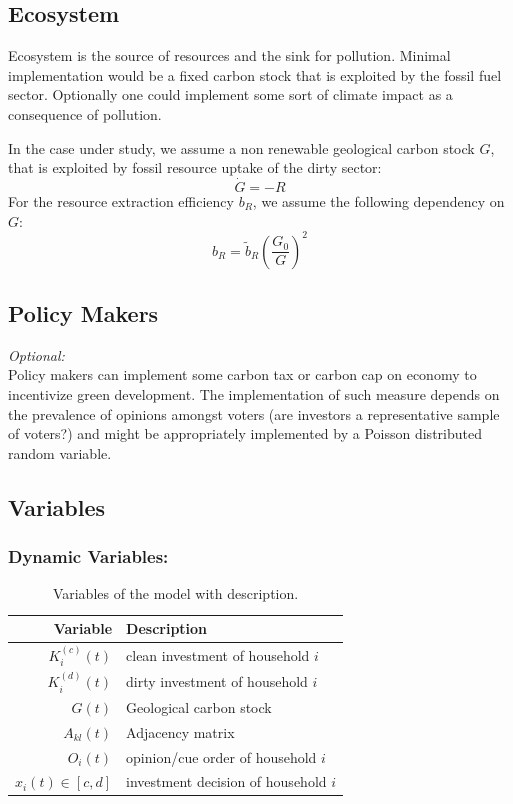 \subsection{Ecosystem}
Ecosystem is the source of resources and the sink for pollution. Minimal implementation would be a fixed carbon stock that is exploited by the fossil fuel sector. Optionally one could implement some sort of climate impact as a consequence of pollution.

In the case under study, we assume a non renewable geological carbon stock $G$, that is exploited by fossil resource uptake of the dirty sector:
\begin{equation}
	\dot{G} = -R
	\label{resource_dynamics}
\end{equation}
For the resource extraction efficiency $b_R$, we assume the following dependency on $G$:
\begin{equation}
	b_R = \tilde{b}_R \left( \frac{G_0}{G} \right)^{2}
	\label{extraction_efficiency}
\end{equation}


\subsection{Policy Makers}
\textit{Optional:} \\
Policy makers can implement some carbon tax or carbon cap on economy to incentivize green development. The implementation of such measure depends on the prevalence of opinions amongst voters (are investors a representative sample of voters?) and might be appropriately implemented by a Poisson distributed random variable.

\subsection{Variables}

\subsubsection{Dynamic Variables:}

\begin{table}[H]
	\centering
	\begin{tabular}{r|l}
		Variable & Description \\\hline
		$K^{(c)}_i(t)$ & clean investment of household $i$ \\
		$K^{(d)}_i(t)$ & dirty investment of household $i$ \\
		$G(t)$ & Geological carbon stock \\
		$A_{kl}(t)$ & Adjacency matrix \\
		$O_i(t)$ & opinion/cue order of household $i$ \\
		$x_i(t) \in [c,d]$ & investment decision of household $i$ 
	\end{tabular}
	\caption{Variables of the model with description.}
	\label{tab:independent_variables}
\end{table}
 
